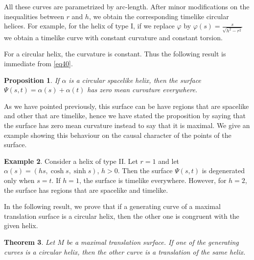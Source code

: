 \documentclass[a4paper,12pt]{amsart}
\numberwithin{equation}{section}
\newtheorem{theorem}{Theorem}[section]
\newtheorem{proposition}[theorem]{Proposition}
\theoremstyle{definition}
\newtheorem{example}[theorem]{Example}
\begin{document}
All these curves are parametrized by arc-length. After minor modifications on the inequalities between $r$ and $h$, we obtain the corresponding timelike circular helices.  For example, for the helix  of type I, if we replace $\varphi$ by $\varphi(s)=\frac{s}{\sqrt{h^2-r^2}}$ we obtain a timelike curve with constant curvature and constant torsion.   
 

For a circular helix, the curvature is constant. Thus the following result is immediate from \eqref{eq40}.  

\begin{proposition} \label{pr41}
If  $\alpha$ is a circular spacelike helix, then the  surface  
$\Psi(s,t)=\alpha(s)+ \alpha(t)$ has zero mean curvature everywhere.
\end{proposition}

As we have pointed previously, this surface can be have regions that are spacelike and other that are timelike, hence we have stated the proposition by saying that the surface has zero mean curvature instead to say that it is maximal. We give an example showing this behaviour on the causal character of the points of the surface.

\begin{example} Consider a helix of type II. Let $r=1$ and let   $\alpha(s)=(hs,\cosh s,\sinh s)$, $h>0$. Then the surface $\Psi(s,t)$ is degenerated only when $s=t$. If $h=1$, the surface is timelike everywhere.  However, for $h=2$, the surface has regions that are spacelike and timelike.
\end{example}





In the following result, we prove that if a generating curve of a  maximal translation surface is a circular helix, then the other one is congruent with the given helix.  


 

\begin{theorem}\label{t42} Let $M$ be a maximal translation surface. If one of the generating curves is a circular helix, then the other curve is a translation of the same helix. \end{theorem}
\end{document}

